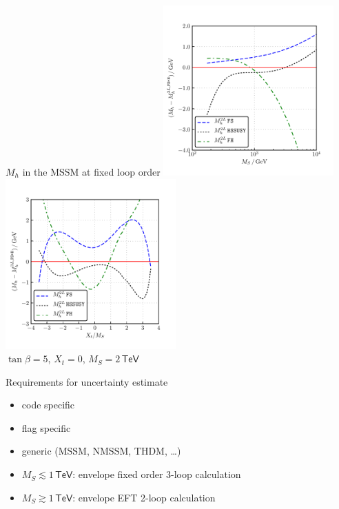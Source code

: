 \documentclass[hyperref={pdfpagelabels=false},ngerman]{beamer}
\newcommand{\eh}[1]{\,\mathsf{#1}}
\newcommand{\MS}{\ensuremath{M_S}}
\begin{document}
\begin{frame}{$M_h$ in the MSSM at fixed loop order}
  \includegraphics[width=0.49\textwidth]{plots/Mh3L/scan_Mh_MS_TB-5_Xt-0_diff}\hfill
  \includegraphics[width=0.49\textwidth]{plots/Mh3L/scan_Mh_Xt_TB-5_MS-2000_diff}\\
  $\tan\beta=5$, $X_t=0$, $\MS = 2\eh{TeV}$
\end{frame}

\begin{frame}{Requirements for uncertainty estimate}
  \begin{itemize}
  \item code specific
  \item flag specific
  \item generic (MSSM, NMSSM, THDM, \ldots)
  \item $\MS \lesssim 1\eh{TeV}$: envelope fixed order 3-loop calculation
  \item $\MS \gtrsim 1\eh{TeV}$: envelope EFT 2-loop calculation
  \end{itemize}
\end{frame}
\end{document}

